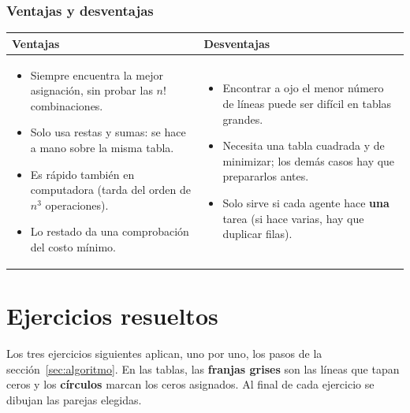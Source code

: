 \documentclass[11pt,a4paper]{article}
\begin{document}
\section{Ventajas y desventajas}

\begin{center}\small
\begin{tabular}{p{7.2cm}p{7.2cm}}
\toprule
\textbf{Ventajas} & \textbf{Desventajas} \\
\midrule
\begin{itemize}[leftmargin=*, itemsep=2pt, topsep=2pt]
  \item Siempre encuentra la mejor asignación, sin probar las $n!$ combinaciones.
  \item Solo usa restas y sumas: se hace a mano sobre la misma tabla.
  \item Es rápido también en computadora (tarda del orden de $n^3$ operaciones).
  \item Lo restado da una comprobación del costo mínimo.
\end{itemize}
&
\begin{itemize}[leftmargin=*, itemsep=2pt, topsep=2pt]
  \item Encontrar a ojo el menor número de líneas puede ser difícil en tablas grandes.
  \item Necesita una tabla cuadrada y de minimizar; los demás casos hay que prepararlos antes.
  \item Solo sirve si cada agente hace \textbf{una} tarea (si hace varias, hay que duplicar filas).
\end{itemize}
\\
\bottomrule
\end{tabular}
\end{center}

\part{Ejercicios resueltos}
\setcounter{section}{0}

Los tres ejercicios siguientes aplican, uno por uno, los pasos de la sección~\ref{sec:algoritmo}. En las tablas, las
\textbf{franjas grises} son las líneas que tapan ceros y los \textbf{círculos} marcan los ceros asignados. Al final de
cada ejercicio se dibujan las parejas elegidas.

\end{document}
